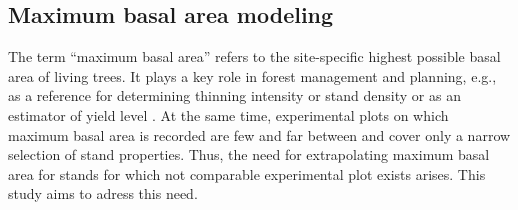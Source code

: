 \subsection{Maximum basal area modeling}

The term “maximum basal area” refers to the site-specific highest possible basal area of living trees.  It plays a key role in forest management and planning, e.g., as a reference for determining thinning intensity \parencite{Assmann1961,Doebbeler2002} or stand density \parencite{Spellmann1999} or as an estimator of yield level \parencite{Franz1967}.  At the same time, experimental plots on which maximum basal area is recorded are few and far between and cover only a narrow selection of stand properties.  Thus, the need for extrapolating maximum basal area for stands for which not comparable experimental plot exists arises.  This study aims to adress this need.

